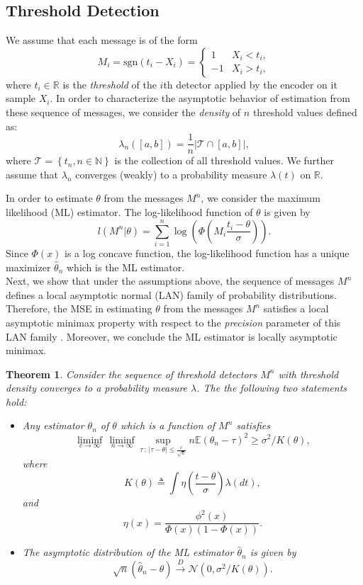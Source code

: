 \documentclass[letterpaper, conference]{IEEEtran}      %
\newtheorem{thm}{\bf{Theorem}}
\newcommand{\sgn}{\mathrm{sgn} }
\begin{document}
\subsection{Threshold Detection}
We assume that each message is of the form
\[
M_i = \sgn(t_i - X_i) = \begin{cases} 1 & X_i< t_i, \\
-1 & X_i > t_i,
\end{cases}  
\]
where $t_i\in\mathbb R$ is the \emph{threshold} of the $i$th detector applied by the encoder on it sample $X_i$. In order to characterize the asymptotic behavior of estimation from these sequence of messages, we consider the \emph{density} of $n$ threshold values defined as:
\[
\lambda_n([a,b]) = \frac{1}{n} \left| \mathcal T \cap [a,b] \right|,
\]
where $\mathcal T  = \left\{t_n, n \in \mathbb N \right\}$ is the collection of all threshold values. We further assume that $\lambda_n$ converges (weakly) to a probability measure $\lambda(t)$ on $\mathbb R$.  \par
In order to estimate $\theta$ from the messages $M^n$, we consider the maximum likelihood (ML) estimator. The log-likelihood function of $\theta$ is given by
\[
l(M^n  |\theta ) =  \sum_{i=1}^n \log \left( \Phi \left( M_i \frac{t_i - \theta}{\sigma} \right) \right). 
\]
Since $\Phi(x)$ is a log concave function, the log-likelihood function has a unique maximizer $\widehat{\theta}_n$ which is the ML estimator.  \\

Next, we show that under the assumptions above, the sequence of messages $M^n$ defines a local asymptotic normal (LAN) family of probability distributions. Therefore, the MSE in estimating $\theta$ from the messages $M^n$ satisfies a local asymptotic minimax property with respect to the \emph{precision} parameter of this LAN family \cite{van2000asymptotic}. Moreover, we conclude the ML estimator is locally asymptotic minimax. 

\begin{thm} \label{thm:LAN}
Consider the sequence of threshold detectors $M^n$ with threshold density converges to a probability measure $\lambda$. The the following two statements hold:
\begin{itemize}
\item[(i)] Any estimator ${\theta}_n$ of $\theta$ which is a function of $M^n$ satisfies
\[
\liminf_{c\rightarrow \infty}\, \liminf_{n\rightarrow \infty} \sup_{\tau\,:\,| \tau - \theta| \leq \frac{c}{\sqrt{n}} }  n \mathbb E \left({\theta}_n - \tau \right)^2 \geq \sigma^2/K(\theta),
\]
where 
\[
K(\theta) \triangleq \int \eta\left(\frac{t-\theta}{\sigma} \right) \lambda(dt),
\]
and 
\[
 \eta(x) = \frac{ \phi^2\left( x \right)}{ \Phi\left( x \right) \left(1-\Phi\left(x\right) \right)}. 
\]
\item[(ii)] The asymptotic distribution of the ML estimator $\widehat{\theta}_n$ is given by
\[
\sqrt{n}(\widehat{\theta}_n - \theta) \overset{D}{\rightarrow} \mathcal N\left(0,\sigma^2/K(\theta) \right).
\]
\end{itemize}
\end{thm}
\end{document}
